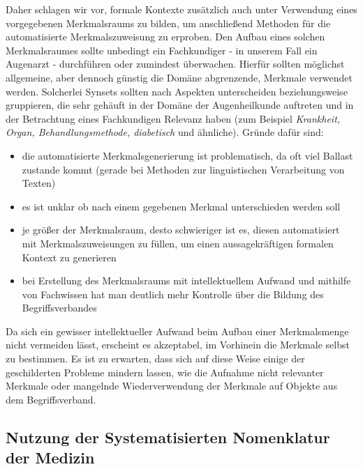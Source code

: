 \documentclass[pagesize,DIV=calc,12pt,final]{scrreprt}
\begin{document}
Daher schlagen wir vor, formale Kontexte zusätzlich auch unter Verwendung eines vorgegebenen Merkmalsraums zu bilden, um anschließend Methoden für die automatisierte Merkmalszuweisung zu erproben.
Den Aufbau eines solchen Merkmalsraumes sollte unbedingt ein Fachkundiger - in unserem Fall ein Augenarzt - durchführen oder zumindest überwachen. 
Hierfür sollten möglichst allgemeine, aber dennoch günstig die Domäne abgrenzende, Merkmale verwendet werden.
Solcherlei Synsets sollten nach Aspekten unterscheiden beziehungsweise gruppieren, die sehr gehäuft in der Domäne der Augenheilkunde auftreten und in der Betrachtung eines Fachkundigen Relevanz haben (zum Beispiel \textit{Krankheit, Organ, Behandlungsmethode, diabetisch} und ähnliche). 
Gründe dafür sind:
\begin{itemize}
\item die automatisierte Merkmalsgenerierung ist problematisch, da oft viel Ballast zustande kommt (gerade bei Methoden zur linguistischen Verarbeitung von Texten)
\item es ist unklar ob nach einem gegebenen Merkmal unterschieden werden soll
\item je größer der Merkmalsraum, desto schwieriger ist es, diesen automatisiert mit Merkmalszuweisungen zu füllen, um einen aussagekräftigen formalen Kontext zu generieren
\item bei Erstellung des Merkmalsraums mit intellektuellem Aufwand und mithilfe von Fachwissen hat man deutlich mehr Kontrolle über die Bildung des Begriffsverbandes
\end{itemize}
Da sich ein gewisser intellektueller Aufwand beim Aufbau einer Merkmalsmenge nicht vermeiden lässt, erscheint es akzeptabel, im Vorhinein die Merkmale selbst zu bestimmen.
Es ist zu erwarten, dass sich auf diese Weise einige der geschilderten Probleme mindern lassen, wie die Aufnahme nicht relevanter Merkmale oder mangelnde Wiederverwendung der Merkmale auf Objekte aus dem Begriffsverband. 

\subsection{Nutzung der Systematisierten Nomenklatur der Medizin}
\end{document}

